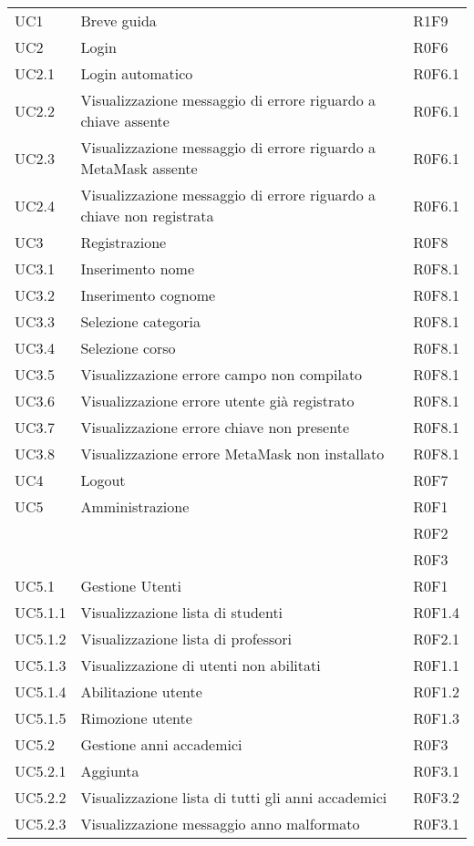 \documentclass[AnalisiDeiRequisiti.tex]{subfiles}
\begin{document}
\begin{longtable}[H]{p{2cm}p{5cm}p{5cm}}
	UC1 & Breve guida & R1F9 \\  
	UC2 & Login & R0F6 \\  
	UC2.1 & Login automatico & R0F6.1 \\  
	UC2.2 & Visualizzazione messaggio di errore riguardo a chiave assente & R0F6.1 \\  
	UC2.3 & Visualizzazione messaggio di errore riguardo a MetaMask assente & R0F6.1 \\  
	UC2.4 & Visualizzazione messaggio di errore riguardo a chiave non registrata & R0F6.1 \\  
	UC3 & Registrazione & R0F8 \\
	UC3.1 & Inserimento nome & R0F8.1 \\  
	UC3.2 & Inserimento cognome & R0F8.1 \\  
	UC3.3 & Selezione categoria & R0F8.1 \\  
	UC3.4 & Selezione corso & R0F8.1 \\  
	UC3.5 & Visualizzazione errore campo non compilato & R0F8.1 \\  
	UC3.6 & Visualizzazione errore utente già registrato & R0F8.1 \\  
	UC3.7 & Visualizzazione errore chiave non presente & R0F8.1 \\  
	UC3.8 & Visualizzazione errore MetaMask non installato & R0F8.1 \\  
	UC4 & Logout & R0F7 \\  
	UC5 & Amministrazione &  R0F1 \\ 
	& & R0F2 \\
	& & R0F3 \\  
	UC5.1 & Gestione Utenti &  R0F1 \\  
	UC5.1.1 & Visualizzazione lista di studenti & R0F1.4 \\  
	UC5.1.2 & Visualizzazione lista di professori &  R0F2.1\\  
	UC5.1.3 & Visualizzazione di utenti non abilitati & R0F1.1 \\  
	UC5.1.4 & Abilitazione utente & R0F1.2 \\    
	UC5.1.5 & Rimozione utente & R0F1.3 \\  
	UC5.2 & Gestione anni accademici &  R0F3 \\  
	UC5.2.1 & Aggiunta \citGloss{anno accademico} &  R0F3.1 \\  
	UC5.2.2 & Visualizzazione lista di tutti gli anni accademici & R0F3.2 \\   
	UC5.2.3 & Visualizzazione messaggio anno malformato & R0F3.1 \\  

\end{longtable}
\end{document}
